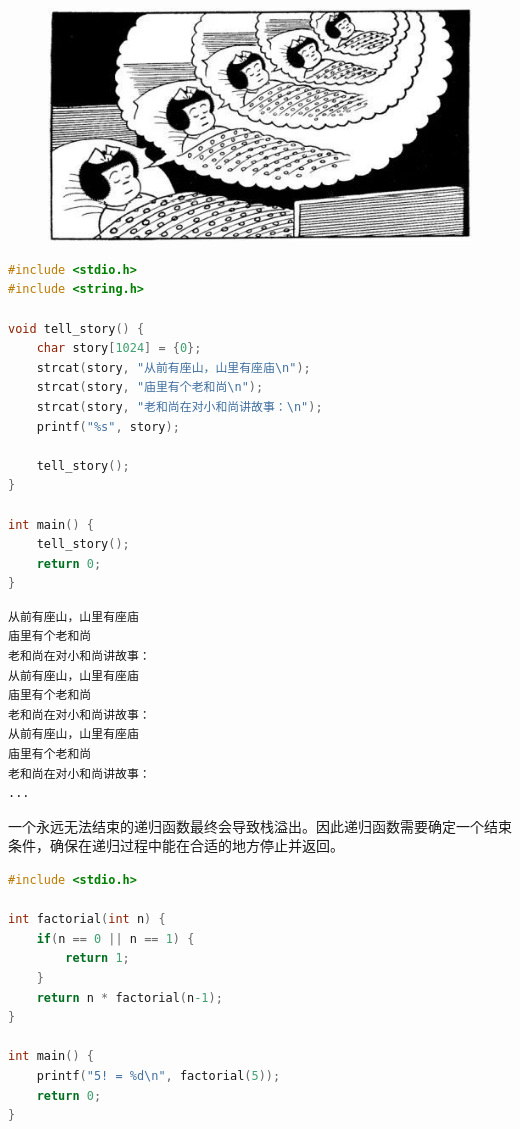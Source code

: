 \begin{figure}[H]
	\centering
	\includegraphics[scale=0.7]{img/Chapter5/5-3/1.png}
\end{figure}

\vspace{0.5cm}


\begin{lstlisting}[language=C]
#include <stdio.h>
#include <string.h>

void tell_story() {
	char story[1024] = {0};
	strcat(story, "从前有座山，山里有座庙\n");
	strcat(story, "庙里有个老和尚\n");
	strcat(story, "老和尚在对小和尚讲故事：\n");
	printf("%s", story);

	tell_story();
}

int main() {
	tell_story();
	return 0;
}
\end{lstlisting}

\begin{tcolorbox}
	\begin{verbatim}
从前有座山，山里有座庙
庙里有个老和尚
老和尚在对小和尚讲故事：
从前有座山，山里有座庙
庙里有个老和尚
老和尚在对小和尚讲故事：
从前有座山，山里有座庙
庙里有个老和尚
老和尚在对小和尚讲故事：
...
	\end{verbatim}
\end{tcolorbox}

一个永远无法结束的递归函数最终会导致栈溢出。因此递归函数需要确定一个结束条件，确保在递归过程中能在合适的地方停止并返回。\\


\begin{lstlisting}[language=C]
#include <stdio.h>

int factorial(int n) {
    if(n == 0 || n == 1) {
        return 1;
    }
    return n * factorial(n-1);
}

int main() {
    printf("5! = %d\n", factorial(5));
    return 0;
}
\end{lstlisting}

